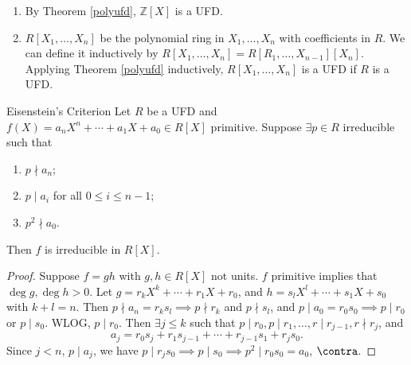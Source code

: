 \begin{example}
    \leavevmode
    \begin{enumerate}
        \item By Theorem \eqref{polyufd}, \(\mathbb{Z}[X]\) is a UFD.
        \item \(R[X_1, \ldots, X_n]\) be the polynomial ring in \(X_1, \ldots, X_n\) with coefficients in \(R\). We can define it inductively by \(R[X_1, \ldots, X_n] = R[R_1, \ldots, X_{n-1}][X_n]\). Applying Theorem \eqref{polyufd} inductively, \(R[X_1, \ldots, X_n]\) is a UFD if \(R\) is a UFD.
    \end{enumerate}
\end{example}
\begin{theorem}{Eisenstein's Criterion}{}
    Let \(R\) be a UFD and \(f(X) = a_n X^n + \cdots + a_1 X + a_0 \in R[X]\) primitive. Suppose \(\exists p \in R\) irreducible such that
    \begin{enumerate}
        \item \(p \nmid a_n\);
        \item \(p \mid a_i\) for all \(0 \leq i \leq n - 1\);
        \item \(p^2 \nmid a_0\).
    \end{enumerate}
    Then \(f\) is irreducible in \(R[X]\).
\end{theorem}
\begin{proof}
    Suppose \(f = gh\) with \(g, h \in R[X]\) not units. \(f\) primitive implies that \(\deg g, \deg h > 0\). Let \(g = r_k X^k + \cdots + r_1 X + r_0\), and \(h = s_l X^l + \cdots + s_1 X + s_0\) with \(k + l = n\). Then \(p \nmid a_n = r_k s_l \implies p \nmid r_k\) and \(p \nmid s_l\), and \(p \mid a_0 = r_0 s_0\implies p \mid r_0\) or \(p \mid s_0\). WLOG, \(p \mid r_0\). Then \(\exists j \leq k\) such that \(p \mid r_0, p \mid r_1, \ldots, r\mid r_{j-1}, r\nmid r_j\), and
    \[
        a_j = r_0 s_j + r_1 s_{j-1} + \cdots + r_{j-1}s_1 + r_j s_0.
    \]
    Since \(j < n\), \(p\mid a_j\), we have \(p \mid r_j s_0 \implies p \mid s_0 \implies p^2 \mid r_0 s_0 = a_0\), \(\contra\).
\end{proof}
